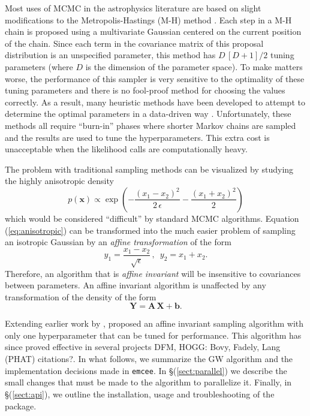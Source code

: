 \documentclass[12pt,preprint]{aastex}
\newcommand{\project}[1]{\texttt{#1}}
\newcommand{\thisplain}{emcee}
\newcommand{\this}{\project{\thisplain}}
\newcommand{\Eq}[1]{Equation (\ref{eq:#1})}
\newcommand{\eqlabel}[1]{\label{eq:#1}}
\newcommand{\sect}[1]{\S (\ref{sect:#1})}
\begin{document}
Most uses of MCMC in the astrophysics literature are based on slight
modifications to the Metropolis-Hastings (M-H) method
\citep[e.g.][]{MacKay:2003}. Each step in a M-H chain is proposed using a
multivariate Gaussian centered on the current position of the chain. Since
each term in the covariance matrix of this proposal distribution is an
unspecified parameter, this method has $D\,[D+1]/2$ tuning parameters (where
$D$ is the dimension of the parameter space).  To make matters worse, the
performance of this sampler is very sensitive to the optimality of these
tuning parameters and there is no fool-proof method for choosing the values
correctly. As a result, many heuristic methods have been developed to attempt
to determine the optimal parameters in a data-driven way
\citep[e.g.][]{Gregory:2005,Dunkley:2005,Widrow:2008}. Unfortunately, these
methods all require ``burn-in'' phases where shorter Markov chains
are sampled and the results are used to tune the hyperparameters. This extra
cost is unacceptable when the likelihood calls are computationally heavy.

The problem with traditional sampling methods can be visualized by studying
the highly anisotropic density
\begin{equation}
    \eqlabel{anisotropic}
    p(\mathbf{x}) \propto \exp \left (-\frac{(x_1-x_2)^2}{2\,\epsilon}
                                        - \frac{(x_1+x_2)^2}{2} \right )
\end{equation}
which would be considered ``difficult'' by standard MCMC algorithms.
\Eq{anisotropic} can be transformed into the much easier problem of sampling
an isotropic Gaussian by an \emph{affine transformation} of the form
\begin{equation}
    y_1 = \frac{x_1-x_2}{\sqrt{\epsilon}} \, , \,\,\, y_2 = x_1 + x_2.
\end{equation}
Therefore, an algorithm that is \emph{affine invariant} will be insensitive to
covariances between parameters. An affine invariant algorithm is unaffected by
any transformation of the density of the form
\begin{equation}
    \mathbf{Y} = \mathbf{A}\, \mathbf{X} + \mathbf{b}.
\end{equation}

Extending earlier work by \citet{Christen:2007},
\citet[][hereafter GW]{Goodman:2010} proposed an affine invariant sampling
algorithm with only one hyperparameter that can be tuned for performance.
This algorithm has since proved effective in several projects
\citep[e.g.][Foreman-Mackey \& Widrow~2012, in prep.]{Hou:2011, Lang:2011}
DFM, HOGG: Bovy, Fadely, Lang (PHAT) citations?.
In what follows, we summarize the GW algorithm and the implementation
decisions made in \this. In \sect{parallel} we describe the small changes
that must be made to the algorithm to parallelize it. Finally, in \sect{api},
we outline the installation, usage and troubleshooting of the package.
\end{document}
